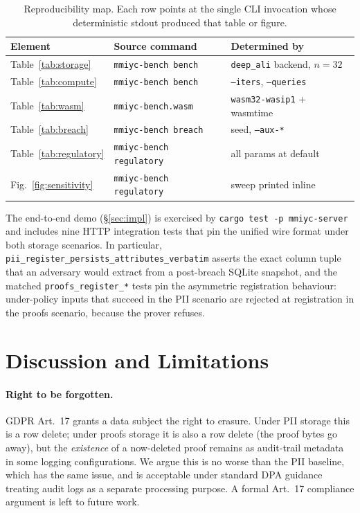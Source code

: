 \documentclass[11pt,a4paper]{article}
\begin{document}
\begin{table}[h]
  \centering
  \caption{Reproducibility map.  Each row points at the single
    CLI invocation whose deterministic stdout produced that
    table or figure.}
  \label{tab:repro}
  \begin{tabular}{l l l}
    \toprule
    \textbf{Element} & \textbf{Source command}                 & \textbf{Determined by}              \\
    \midrule
    Table~\ref{tab:storage}     & \texttt{mmiyc-bench bench}      & \texttt{deep\_ali} backend, $n=32$  \\
    Table~\ref{tab:compute}     & \texttt{mmiyc-bench bench}      & \texttt{--iters}, \texttt{--queries} \\
    Table~\ref{tab:wasm}        & \texttt{mmiyc-bench.wasm}       & \texttt{wasm32-wasip1} + wasmtime    \\
    Table~\ref{tab:breach}      & \texttt{mmiyc-bench breach}     & seed, \texttt{--aux-*}              \\
    Table~\ref{tab:regulatory}  & \texttt{mmiyc-bench regulatory} & all params at default               \\
    Fig.~\ref{fig:sensitivity}  & \texttt{mmiyc-bench regulatory} & sweep printed inline                \\
    \bottomrule
  \end{tabular}
\end{table}

The end\nobreakdash-to\nobreakdash-end demo (\S\ref{sec:impl}) is
exercised by \texttt{cargo test -p mmiyc-server} and includes nine
HTTP integration tests that pin the unified wire format under both
storage scenarios.  In particular,
\texttt{pii\_register\_persists\_attributes\_verbatim} asserts the
exact column tuple that an adversary would extract from a
post\nobreakdash-breach SQLite snapshot, and the matched
\texttt{proofs\_register\_*} tests pin the asymmetric registration
behaviour: under\nobreakdash-policy inputs that succeed in the PII
scenario are rejected at registration in the proofs scenario,
because the prover refuses.

\section{Discussion and Limitations}
\label{sec:discussion}

\paragraph{Right to be forgotten.}  GDPR Art.~17 grants a data
subject the right to erasure.  Under PII storage this is a row
delete; under proofs storage it is also a row delete (the proof
bytes go away), but the \emph{existence} of a now\nobreakdash-deleted
proof remains as audit\nobreakdash-trail metadata in some logging
configurations.  We argue this is no worse than the PII baseline,
which has the same issue, and is acceptable under standard
DPA guidance treating audit logs as a separate processing
purpose.  A formal Art.~17 compliance argument is left to future
work.
\end{document}
